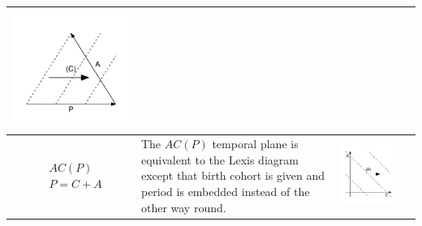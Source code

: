 \documentclass[11pt,oneside,a4paper]{article} %
\begin{document}
\begin{center}
\begin{longtable}{m{}m{}m{}m{}}
  \includegraphics[width = \linewidth]{Figures/JonasTable/APc_iso.pdf}  \\
  \midrule
  $$\begin{aligned}
    &AC(P) \\
    &P = C + A
  \end{aligned}$$ &
  The $AC(P)$ temporal plane is equivalent to the Lexis diagram except that
  birth cohort is given and period is embedded instead of the other way round. & \includegraphics[width = \linewidth]{Figures/JonasTable/ACp.pdf} &

\end{longtable}
\end{center}
\end{document}
